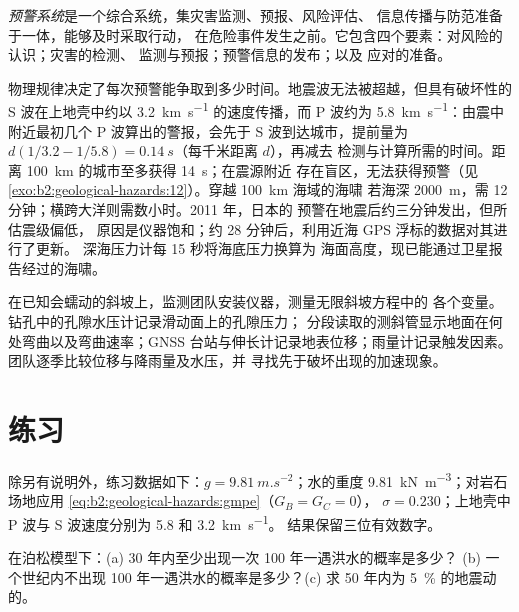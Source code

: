 \begin{definition}[预警系统]\label{def:b2:geological-hazards:warning}
\emph{预警系统}是一个综合系统，集灾害监测、预报、风险评估、
信息传播与防范准备于一体，能够及时采取行动，
在危险事件发生之前。它包含四个要素：对风险的认识；灾害的检测、
监测与预报；预警信息的发布；以及
应对的准备。
\end{definition}

物理规律决定了每次预警能争取到多少时间。地震波无法被超越，但具有破坏性的
S 波在上地壳中约以 \qty{3.2}{km.s^{-1}} 的速度传播，而
P 波约为 \qty{5.8}{km.s^{-1}}：由震中附近最初几个 P 波算出的警报，会先于
S 波到达城市，提前量为 $d(1/3.2 - 1/5.8) = \qty{0.14}{s}$（每千米距离 $d$），再减去
检测与计算所需的时间。距离 \qty{100}{km} 的城市至多获得 \qty{14}{s}；在震源附近
存在盲区，无法获得预警（见\cref{exo:b2:geological-hazards:12}）。穿越 \qty{100}{km} 海域的海啸
若海深 \qty{2000}{m}，需 12 分钟；横跨大洋则需数小时。2011 年，日本的
预警在地震后约三分钟发出，但所估震级偏低，
原因是仪器饱和；约 28 分钟后，利用近海 GPS 浮标的数据对其进行了更新。
深海压力计每 15 秒将海底压力换算为
海面高度，现已能通过卫星报告经过的海啸。

\begin{inthefield}[观测斜坡的蠕动]
在已知会蠕动的斜坡上，监测团队安装仪器，测量无限斜坡方程中的
各个变量。钻孔中的孔隙水压计记录滑动面上的孔隙压力；
分段读取的测斜管显示地面在何处弯曲以及弯曲速率；GNSS
台站与伸长计记录地表位移；雨量计记录触发因素。
团队逐季比较位移与降雨量及水压，并
寻找先于破坏出现的加速现象。
\end{inthefield}

\section*{练习}\label{sec:b2:geological-hazards:exercises}

除另有说明外，练习数据如下：$g = \qty{9.81}{m.s^{-2}}$；水的重度
\qty{9.81}{kN.m^{-3}}；对岩石场地应用 \eqref{eq:b2:geological-hazards:gmpe}（$G_B = G_C = 0$），
$\sigma = 0.230$；上地壳中 P 波与 S 波速度分别为 5.8 和 \qty{3.2}{km.s^{-1}}。
结果保留三位有效数字。

\begin{exercise}[$\star$]\label{exo:b2:geological-hazards:1}
在泊松模型下：(a) 30 年内至少出现一次 100 年一遇洪水的概率是多少？
(b) 一个世纪内不出现 100 年一遇洪水的概率是多少？(c) 求
50 年内为 \qty{5}{\percent} 的地震动的。
\end{exercise}

